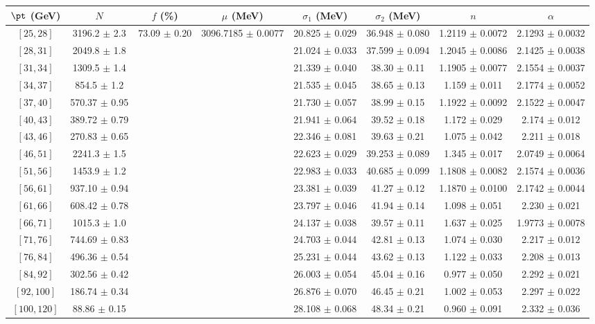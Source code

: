\begin{tabular}{c||c|c|c|c|c|c|c}
$\pt$ (GeV) & $N$ & $f$ (\%) & $\mu$ (MeV) & $\sigma_1$ (MeV) & $\sigma_2$ (MeV) & $n$ & $\alpha$ \\
\hline
$[25, 28]$ & 3196.2 $\pm$ 2.3 & \multirow{17}{*}{73.09 $\pm$ 0.20} & \multirow{17}{*}{3096.7185 $\pm$ 0.0077} & 20.825 $\pm$ 0.029 & 36.948 $\pm$ 0.080 & 1.2119 $\pm$ 0.0072 & 2.1293 $\pm$ 0.0032\\
$[28, 31]$ & 2049.8 $\pm$ 1.8 &  &  & 21.024 $\pm$ 0.033 & 37.599 $\pm$ 0.094 & 1.2045 $\pm$ 0.0086 & 2.1425 $\pm$ 0.0038\\
$[31, 34]$ & 1309.5 $\pm$ 1.4 &  &  & 21.339 $\pm$ 0.040 & 38.30 $\pm$ 0.11 & 1.1905 $\pm$ 0.0077 & 2.1554 $\pm$ 0.0037\\
$[34, 37]$ & 854.5 $\pm$ 1.2 &  &  & 21.535 $\pm$ 0.045 & 38.65 $\pm$ 0.13 & 1.159 $\pm$ 0.011 & 2.1774 $\pm$ 0.0052\\
$[37, 40]$ & 570.37 $\pm$ 0.95 &  &  & 21.730 $\pm$ 0.057 & 38.99 $\pm$ 0.15 & 1.1922 $\pm$ 0.0092 & 2.1522 $\pm$ 0.0047\\
$[40, 43]$ & 389.72 $\pm$ 0.79 &  &  & 21.941 $\pm$ 0.064 & 39.52 $\pm$ 0.18 & 1.172 $\pm$ 0.029 & 2.174 $\pm$ 0.012\\
$[43, 46]$ & 270.83 $\pm$ 0.65 &  &  & 22.346 $\pm$ 0.081 & 39.63 $\pm$ 0.21 & 1.075 $\pm$ 0.042 & 2.211 $\pm$ 0.018\\
$[46, 51]$ & 2241.3 $\pm$ 1.5 &  &  & 22.623 $\pm$ 0.029 & 39.253 $\pm$ 0.089 & 1.345 $\pm$ 0.017 & 2.0749 $\pm$ 0.0064\\
$[51, 56]$ & 1453.9 $\pm$ 1.2 &  &  & 22.983 $\pm$ 0.033 & 40.685 $\pm$ 0.099 & 1.1808 $\pm$ 0.0082 & 2.1574 $\pm$ 0.0036\\
$[56, 61]$ & 937.10 $\pm$ 0.94 &  &  & 23.381 $\pm$ 0.039 & 41.27 $\pm$ 0.12 & 1.1870 $\pm$ 0.0100 & 2.1742 $\pm$ 0.0044\\
$[61, 66]$ & 608.42 $\pm$ 0.78 &  &  & 23.797 $\pm$ 0.046 & 41.94 $\pm$ 0.14 & 1.098 $\pm$ 0.051 & 2.230 $\pm$ 0.021\\
$[66, 71]$ & 1015.3 $\pm$ 1.0 &  &  & 24.137 $\pm$ 0.038 & 39.57 $\pm$ 0.11 & 1.637 $\pm$ 0.025 & 1.9773 $\pm$ 0.0078\\
$[71, 76]$ & 744.69 $\pm$ 0.83 &  &  & 24.703 $\pm$ 0.044 & 42.81 $\pm$ 0.13 & 1.074 $\pm$ 0.030 & 2.217 $\pm$ 0.012\\
$[76, 84]$ & 496.36 $\pm$ 0.54 &  &  & 25.231 $\pm$ 0.044 & 43.62 $\pm$ 0.13 & 1.122 $\pm$ 0.033 & 2.208 $\pm$ 0.013\\
$[84, 92]$ & 302.56 $\pm$ 0.42 &  &  & 26.003 $\pm$ 0.054 & 45.04 $\pm$ 0.16 & 0.977 $\pm$ 0.050 & 2.292 $\pm$ 0.021\\
$[92, 100]$ & 186.74 $\pm$ 0.34 &  &  & 26.876 $\pm$ 0.070 & 46.45 $\pm$ 0.21 & 1.002 $\pm$ 0.053 & 2.297 $\pm$ 0.022\\
$[100, 120]$ & 88.86 $\pm$ 0.15 &  &  & 28.108 $\pm$ 0.068 & 48.34 $\pm$ 0.21 & 0.960 $\pm$ 0.091 & 2.332 $\pm$ 0.036\\
\end{tabular}
